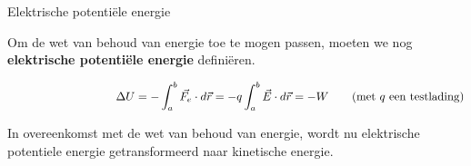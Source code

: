 \begin{theo}{Elektrische potentiële energie}

Om de wet van behoud van energie toe te mogen passen, moeten we nog \textbf{elektrische potentiële energie} definiëren. 




\begin{equation*}
    \hspace{3.25cm}
    \Delta U = -\int_a^b \Vec{F_e} \cdot d\Vec{r} = -q \int_a^b \Vec{E} \cdot d\Vec{r} = -W \quad \quad (\text{met $q$ een testlading})
\end{equation*}

\noindent In overeenkomst met de wet van behoud van energie, wordt nu elektrische potentiele energie getransformeerd naar kinetische energie. 

\end{theo}

